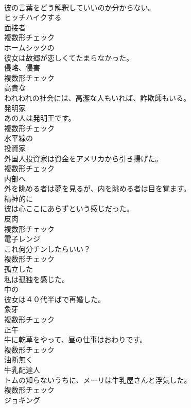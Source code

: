 \documentclass[8pt]{extreport}
\begin{document}
\begin{CJK}{UTF8}{min}
\\	彼の言葉をどう解釈していいのか分からない。	
\\	[動詞]	ヒッチハイクする	
\\	[名詞]	面接者	
\\	複数形チェック
\\	[形容詞]	ホームシックの	
\\	彼女は故郷が恋しくてたまらなかった。	
\\	[名詞]	侵略、侵害	
\\	複数形チェック
\\	[形容詞]	高貴な	
\\	われわれの社会には、高潔な人もいれば、詐欺師もいる。	
\\	[名詞]	発明家	
\\	あの人は発明王です。	
\\	複数形チェック
\\	[形容詞]	水平線の	
\\	[名詞]	投資家	
\\	外国人投資家は資金をアメリカから引き揚げた。	
\\	複数形チェック
\\	[副詞]	内部へ	
\\	外を眺める者は夢を見るが、内を眺める者は目を覚ます。	
\\	[副詞]	精神的に	
\\	彼は心ここにあらずという感じだった。	
\\	[名詞]	皮肉	
\\	複数形チェック
\\	[名詞]	電子レンジ	
\\	これ何分チンしたらいい？	
\\	複数形チェック
\\	[形容詞]	孤立した	
\\	私は孤独を感じた。	
\\	[形容詞]	中の	
\\	彼女は４０代半ばで再婚した。	
\\	[名詞]	象牙	
\\	複数形チェック
\\	[名詞]	正午	
\\	牛に乾草をやって、昼の仕事はおわりです。	
\\	複数形チェック
\\	[副詞]	油断無く	
\\	[名詞]	牛乳配達人	
\\	トムの知らないうちに、メーリは牛乳屋さんと浮気した。	
\\	複数形チェック
\\	[名詞]	ジョギング	

\end{CJK}
\end{document}
